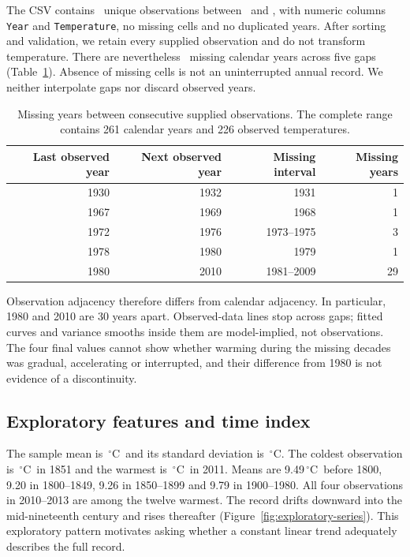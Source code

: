 \documentclass[11pt,a4paper]{article}
\newcommand{\degC}{\ensuremath{^{\circ}\mathrm C}}
\begin{document}
The CSV contains \Nobs\ unique observations between \FirstYear\ and \LastYear, with numeric columns \texttt{Year} and \texttt{Temperature}, no missing cells and no duplicated years. After sorting and validation, we retain every supplied observation and do not transform temperature. There are nevertheless \NMissing\ missing calendar years across five gaps (Table~\ref{tab:gaps}). Absence of missing cells is not an uninterrupted annual record. We neither interpolate gaps nor discard observed years.

\begin{table}[htbp]\centering\small
\caption{Missing years between consecutive supplied observations. The complete range contains 261 calendar years and 226 observed temperatures.}\label{tab:gaps}
\begin{tabular}{rrrr}\toprule
Last observed year & Next observed year & Missing interval & Missing years\\\midrule
1930 & 1932 & 1931 & 1\\
1967 & 1969 & 1968 & 1\\
1972 & 1976 & 1973--1975 & 3\\
1978 & 1980 & 1979 & 1\\
1980 & 2010 & 1981--2009 & 29\\\bottomrule
\end{tabular}\end{table}

Observation adjacency therefore differs from calendar adjacency. In particular, 1980 and 2010 are 30 years apart. Observed-data lines stop across gaps; fitted curves and variance smooths inside them are model-implied, not observations. The four final values cannot show whether warming during the missing decades was gradual, accelerating or interrupted, and their difference from 1980 is not evidence of a discontinuity.

\subsection{Exploratory features and time index}
The sample mean is \YMean\,\degC\ and its standard deviation is \YSd\,\degC. The coldest observation is \YMin\,\degC\ in 1851 and the warmest is \YMax\,\degC\ in 2011. Means are 9.49\,\degC\ before 1800, 9.20 in 1800--1849, 9.26 in 1850--1899 and 9.79 in 1900--1980. All four observations in 2010--2013 are among the twelve warmest. The record drifts downward into the mid-nineteenth century and rises thereafter (Figure~\ref{fig:exploratory-series}). This exploratory pattern motivates asking whether a constant linear trend adequately describes the full record.
\end{document}

